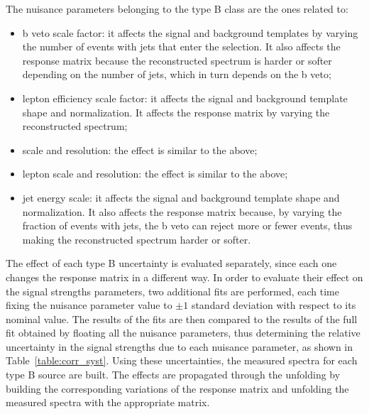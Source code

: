 The nuisance parameters belonging to the type B class are the ones related to:
\begin{itemize}
\item b veto scale factor: it affects the signal and background templates
by varying the number of events with jets that enter the selection. It also
affects the response matrix because the reconstructed spectrum is harder or softer depending on the number of jets, which in turn depends on the b veto;
\item lepton efficiency scale factor: it affects the signal and background
template shape and normalization. It affects the response matrix by varying
the reconstructed spectrum;
\item \MET scale and resolution: the effect is similar to the above;
\item lepton scale and resolution: the effect is similar to the above;
\item jet energy scale: it affects the signal and background template shape
and normalization. It also affects the response matrix because, by varying the
fraction of events with jets, the b veto can reject more or fewer events, thus
making the reconstructed spectrum harder or softer.
\end{itemize}
The effect of each type B uncertainty is evaluated separately,
since each one changes the response matrix in a different way.
In order to evaluate their effect on the signal strengths parameters, two additional fits are
performed, each time fixing  the nuisance parameter value to $\pm 1$  standard
deviation with respect
to its nominal value. The results of the fits are then compared to the results of the full fit obtained by floating  all the nuisance parameters, thus 
determining the relative uncertainty in the signal strengths due to each
nuisance parameter, as shown in Table~\ref{table:corr_syst}. 
Using these uncertainties, the measured spectra for each type B
source are built.
The effects are propagated through the unfolding by building the corresponding variations of the response matrix and unfolding the
measured spectra with the appropriate matrix.
